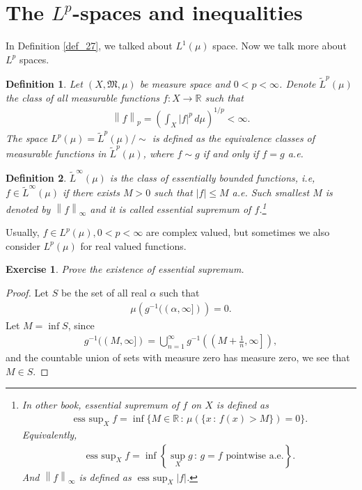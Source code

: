 \documentclass[11pt]{book}
\newtheorem{definition}{Definition}[chapter]
\newtheorem{exercise}{Exercise}[section]
\theoremstyle{definition}
\numberwithin{equation}{chapter}
\begin{document}
\section{The $L^p$-spaces and inequalities}

In Definition \ref{def_27}, we talked about $L^1(\mu)$ space. Now we talk more about $L^p$ spaces.

\medskip

\begin{definition}
Let $(X, \mathfrak{M}, \mu)$ be measure space and $0 < p < \infty$. Denote $\widetilde{L}^p(\mu)$ the class of all measurable functions $f: X \to \mathbb{R}$ such that
\begin{align*}
    \left\|f\right\|_p = \left(\int_X \left|f\right|^p\, d\mu \right)^{1/p} < \infty.
\end{align*}
The space $L^p(\mu) = \widetilde{L}^p(\mu) / \sim$ is defined as the equivalence classes of measurable functions in $\widetilde{L}^p(\mu)$, where $f \sim g$ if and only if $f = g$ a.e. 
\end{definition}

\medskip

\begin{definition}
$\widetilde{L}^\infty (\mu)$ is the class of essentially bounded functions, i.e, $f \in \widetilde{L}^\infty (\mu)$ if there exists $M > 0$ such that $\left|f\right| \leq M$ a.e. Such smallest $M$ is denoted by $\left\|f\right\|_{\infty}$ and it is called essential supremum of $f$.\footnote{In other book\cite{33}, {\em essential supremum} of $f$ on $X$ is defined as 
\begin{align*}
    \operatorname{ess~sup}_X f = \inf \{M \in \mathbb{R} \,:\, \mu(\{x \,:\, f(x) > M\}) = 0\}.   
\end{align*}
Equivalently, 
\begin{align*}
    \operatorname{ess~sup}_X f =\inf \left\{\sup_X g \,:\, g = f \,\,\text{pointwise a.e.} \right\}.   
\end{align*}
And $\left\|f\right\|_{\infty}$ is defined as $\operatorname{ess~sup}_X \left|f\right|$.
}
\end{definition}

\medskip

Usually, $f \in L^p(\mu), 0 < p < \infty$ are complex valued, but sometimes we also consider $L^p(\mu)$ for real valued functions.

\medskip

\begin{exercise}
Prove the existence of essential supremum.
\end{exercise}
\begin{proof}
Let $S$ be the set of all real $\alpha$ such that
\begin{align*}
    \mu\left(g^{-1}((\alpha,\infty])\right) = 0.
\end{align*}
Let $M = \inf S$, since
\begin{align*}
    g^{-1} ((M,\infty]) = \bigcup^\infty_{n=1} g^{-1} \left(\left(M + \frac{1}{n},\infty\right]\right),
\end{align*}
and the countable union of sets with measure zero has measure zero, we see that $M \in S$.
\end{proof}
\end{document}
